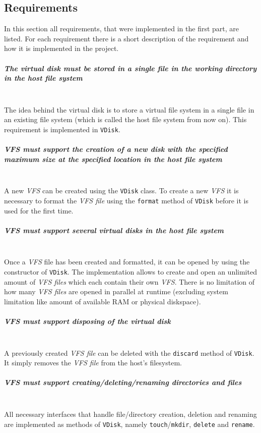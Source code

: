 \documentclass[a4paper,12pt]{article}
\begin{document}
\subsection{Requirements}
In this section all requirements, that were implemented in the first part, are listed. For each requirement there is a short description of the requirement and how it is implemented in the project.

\subparagraph{The virtual disk must be stored in a single file in the working directory in the host file system} \hfill\\
The idea behind the virtual disk is to store a virtual file system in a single file in an existing file system (which is called the host file system from now on). This requirement is implemented in \texttt{VDisk}.

\subparagraph{\emph{VFS} must support the creation of a new disk with the specified maximum size at the specified location in the host file system} \hfill\\
A new \emph{VFS} can be created using the \texttt{VDisk} class. To create a new \emph{VFS} it is necessary to format the \emph{VFS file} using the \texttt{format} method of \texttt{VDisk} before it is used for the first time.


\subparagraph{\emph{VFS} must support several virtual disks in the host file system} \hfill\\
Once a \emph{VFS} file has been created and formatted, it can be opened by using the constructor of \texttt{VDisk}. The implementation allows to create and open an unlimited amount of \emph{VFS files} which each contain their own \emph{VFS}. There is no limitation of how many \emph{VFS files} are opened in parallel at runtime (excluding system limitation like amount of available RAM or physical diskspace).

\subparagraph{\emph{VFS} must support disposing of the virtual disk} \hfill\\
A previously created \emph{VFS file} can be deleted with the \texttt{discard} method of \texttt{VDisk}. It simply removes the \emph{VFS file} from the host's filesystem.

\subparagraph{\emph{VFS} must support creating/deleting/renaming directories and files} \hfill\\
All necessary interfaces that handle file/directory creation, deletion and renaming are implemented as methods of \texttt{VDisk}, namely \texttt{touch}/\texttt{mkdir}, \texttt{delete} and \texttt{rename}.
\end{document}
